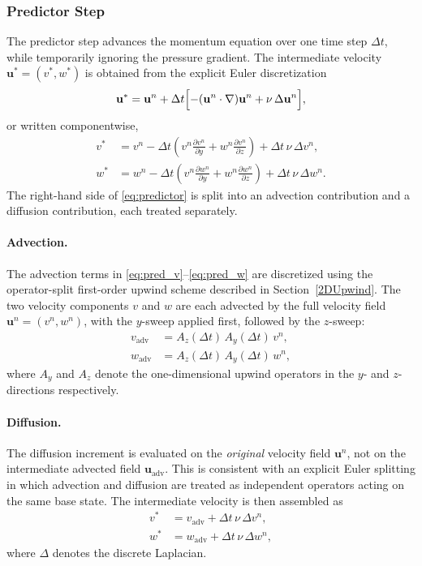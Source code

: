 \subsubsection{Predictor Step}
The predictor step advances the momentum equation over one time step $\Delta t$, while temporarily ignoring the pressure gradient. The intermediate velocity $\mathbf{u}^* = (v^*, w^*)$ is obtained from the explicit Euler discretization
\begin{equation}
    \mathbf{u}^* = \mathbf{u}^n + \Delta t\Bigl[
        -(\mathbf{u}^n \cdot \nabla)\mathbf{u}^n
        + \nu\,\Delta\mathbf{u}^n
    \Bigr],
    \label{eq:predictor}
\end{equation}
or written componentwise,
\begin{align}
    v^* &= v^n - \Delta t\!\left(
               v^n\frac{\partial v^n}{\partial y}
             + w^n\frac{\partial v^n}{\partial z}
           \right) + \Delta t\,\nu\,\Delta v^n, \label{eq:pred_v} \\
    w^* &= w^n - \Delta t\!\left(
               v^n\frac{\partial w^n}{\partial y}
             + w^n\frac{\partial w^n}{\partial z}
           \right) + \Delta t\,\nu\,\Delta w^n. \label{eq:pred_w}
\end{align}
The right-hand side of \eqref{eq:predictor} is split into an advection
contribution and a diffusion contribution, each treated separately.

\paragraph{Advection.}
The advection terms in \eqref{eq:pred_v}--\eqref{eq:pred_w} are
discretized using the operator-split first-order upwind scheme described
in Section~\ref{2DUpwind}. The two velocity components $v$ and $w$ are
each advected by the full velocity field $\mathbf{u}^n = (v^n, w^n)$,
with the $y$-sweep applied first, followed by the $z$-sweep:
\begin{align}
    v_{\mathrm{adv}} &= A_z(\Delta t)\,A_y(\Delta t)\,v^n, \\
    w_{\mathrm{adv}} &= A_z(\Delta t)\,A_y(\Delta t)\,w^n,
\end{align}
where $A_y$ and $A_z$ denote the one-dimensional upwind operators in
the $y$- and $z$-directions respectively.

\paragraph{Diffusion.}
The diffusion increment is evaluated on the \emph{original} velocity
field $\mathbf{u}^n$, not on the intermediate advected field
$\mathbf{u}_{\mathrm{adv}}$. This is consistent with an explicit Euler
splitting in which advection and diffusion are treated as independent
operators acting on the same base state. The intermediate velocity is
then assembled as
\begin{align}
    v^* &= v_{\mathrm{adv}} + \Delta t\,\nu\,\Delta v^n, \\
    w^* &= w_{\mathrm{adv}} + \Delta t\,\nu\,\Delta w^n,
\end{align}
where $\Delta$ denotes the discrete Laplacian.

